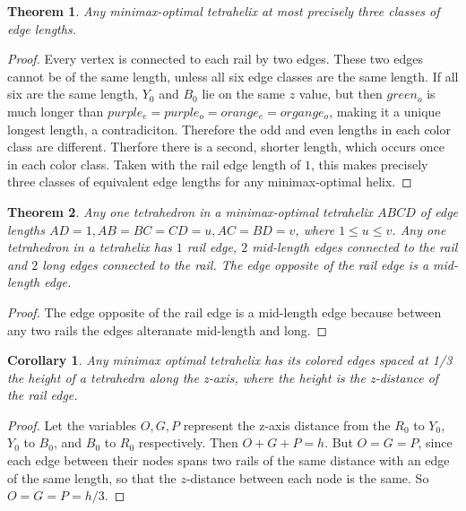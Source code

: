 \documentclass[11pt]{article}
\newtheorem{theorem}{Theorem}
\newtheorem{corollary}{Corollary}
\begin{document}
\begin{theorem}
  Any minimax-optimal tetrahelix at most precisely three classes of edge lengths.
\end{theorem}

\begin{proof}
  Every vertex is connected to each rail by two edges. These two edges cannot be of the same length, unless all six edge classes are the same
  length. If all six are the same length, $Y_0$ and $B_0$ lie on the same $z$ value, but then $green_o$ is much longer than $purple_e = purple_o = orange_e = organge_o$,
  making it a unique longest length, a contradiciton. Therefore the odd and even lengths in each color class are different. Therfore there is a second,
  shorter length, which occurs once in each color class. Taken with the rail edge length of $1$, this makes precisely three classes of equivalent
  edge lengths for any minimax-optimal helix.
\end{proof}
  
\begin{theorem}
  \label{tetrahelixoptimality}
  Any one tetrahedron in a minimax-optimal tetrahelix $ABCD$ of edge lengths $AD = 1, AB = BC = CD = u , AC = BD = v$, where $1 \leq u \leq v$.
  Any one tetrahedron in a tetrahelix has $1$ rail edge, $2$ mid-length edges connected to the rail and $2$ long edges connected to the rail.
  The edge opposite of the rail edge is a mid-length edge.
\end{theorem}

\begin{proof}
The edge opposite of the rail edge is a mid-length edge because between any two rails the edges alteranate mid-length and long.
  \end{proof}

\begin{corollary}
  Any minimax optimal tetrahelix has its colored edges spaced at 1/3 the height of
  a tetrahedra along the z-axis, where the height is the z-distance of the rail edge.
  \end{corollary}

\begin{proof}
  Let the variables $O,G,P$ represent the z-axis distance from the
  $R_0$ to $Y_0$, $Y_0$ to $B_0$, and
  $B_0$ to $R_0$ respectively. Then $O+G+P = h$. But $O=G=P$, since each edge between
  their nodes spans two rails of the same distance with an edge of the same length,
  so that the $z$-distance between each node is the same. So $O=G=P=h/3$.
\end{proof}
\end{document}
